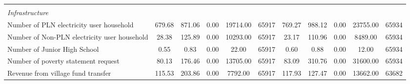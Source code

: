 \begin{tabular}{l*{2}{ccccc}}
\vspace{0.1em} \\ \emph{Infrastructure}&         &         &         &         &         &         &         &         &         &         \\
\hspace{0.25cm} Number of PLN electricity user household&   679.68&   871.06&     0.00& 19714.00&    65917&   769.27&   988.12&     0.00& 23755.00&    65934\\
\hspace{0.25cm} Number of Non-PLN electricity user household&    28.38&   125.89&     0.00& 10293.00&    65917&    23.17&   110.96&     0.00&  8489.00&    65934\\
\hspace{0.25cm} Number of Junior High School&     0.55&     0.83&     0.00&    22.00&    65917&     0.60&     0.88&     0.00&    12.00&    65934\\
\hspace{0.25cm} Number of poverty statement request&    80.13&   176.46&     0.00& 13705.00&    65917&    83.09&   310.76&     0.00& 31600.00&    65934\\
\hspace{0.25cm} Revenue from village fund transfer&   115.53&   203.86&     0.00&  7792.00&    65917&   117.93&   127.47&     0.00& 13662.00&    63682\\
\bottomrule
\end{tabular}
